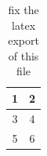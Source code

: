 \documentclass{article}
\begin{document}
\begin{table}[h]
  \centering
  \begin{tabular}{cc}
    \toprule
    1 & 2\\
    \midrule
    3 & 4\\
    5 & 6\\
    \bottomrule
  \end{tabular}
  \caption{fix the latex export of this file}
\end{table}
\end{document}
